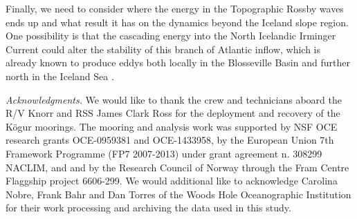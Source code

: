 \documentclass[12pt,titlepage,figuresatend]{article}
\begin{document}
Finally, we need to consider where the energy in the Topographic Rossby waves ends up and what result it has on the dynamics beyond the Iceland slope region. One possibility is that the cascading energy into the North Icelandic Irminger Current could alter the stability of this branch of Atlantic inflow, which is already known to produce eddys both locally in the Blosseville Basin \cite[]{Jonsson2012} and further north in the Iceland Sea \cite[]{Vage2011}.

\bigskip
\emph{Acknowledgments.}
We would like to thank the crew and technicians aboard the R/V Knorr and RSS James Clark Ross for the deployment and recovery of the K\"{o}gur moorings. The mooring and analysis work was supported by NSF OCE research grants OCE-0959381 and OCE-1433958, by the European Union 7th Framework Programme (FP7 2007-2013) under grant agreement n. 308299 NACLIM, and and by the Research Council of Norway through the Fram Centre Flaggship project 6606-299. We would additional like to acknowledge Carolina Nobre, Frank Bahr and Dan Torres of the Woods Hole Oceanographic Institution for their work processing and archiving the data used in this study.



\end{document}
